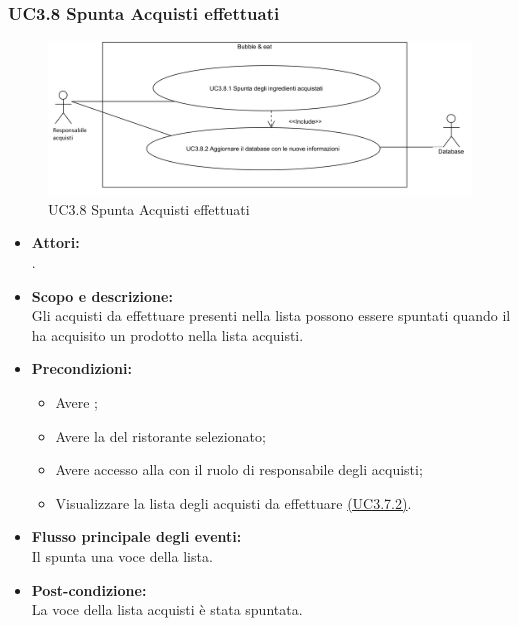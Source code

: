 \subsubsection{UC3.8 Spunta Acquisti effettuati} \label{UC3.8}

\begin{figure}[H]
	\centering
	\includegraphics[width=15cm]{../../documenti/AnalisiDeiRequisiti/Diagrammi_img/uc3_8.png}
	\caption{UC3.8 Spunta Acquisti effettuati}
\end{figure}

\begin{itemize}
	\item \textbf{Attori:}
	\\.
	\item \textbf{Scopo e descrizione:} 
	\\Gli acquisti da effettuare presenti nella lista possono essere spuntati quando il  ha acquisito un prodotto nella lista acquisti.
	\item \textbf{Precondizioni:}
	\begin{itemize}
		\item Avere ;
		\item Avere la  del ristorante selezionato;
		\item Avere accesso alla  con il ruolo di responsabile degli acquisti;
		\item Visualizzare la lista degli acquisti da effettuare \hyperref[UC3.7.2]{(UC3.7.2)}.
	\end{itemize}
	\item \textbf{Flusso principale degli eventi:}
	\\Il {} spunta una voce della lista.
	\item \textbf{Post-condizione:}
	\\La voce della lista acquisti è stata spuntata.
\end{itemize}

